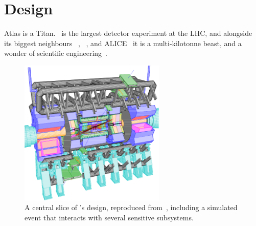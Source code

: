 \section{Design}
\label{sec:atlas_design}
Atlas is a Titan.
\atlas\ is the largest detector experiment at the LHC,
and alongside its biggest neighbours
\cms~\cite{cms2008experiment},
\lhcb~\cite{lhcb2008experiment},
and ALICE~\cite{alice2008experiment}
it is a multi-kilotonne beast,
and a wonder of scientific engineering~\cite{
atlas1994proposal,
atlas2008experiment,
atlas1999design1,
atlas1999design2
}.

\begin{figure}[tp]
\centering
\includegraphics[width=0.62\textwidth]{figures/atlas_cutaway_volume_1.pdf}
\caption[
A central slice of \atlas's design
]{%
A central slice of \atlas's design, reproduced from~\cite{atlas1999design1,
persint2014manual},
including a simulated event that interacts with several sensitive subsystems.
}
\label{fig:atlas_cutaway}
\end{figure}

